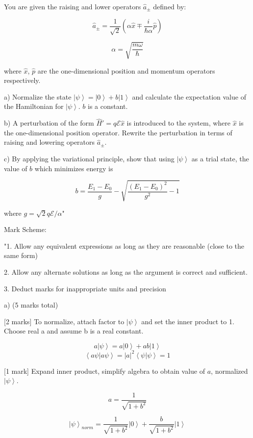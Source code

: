 You are given the raising and lower operators \( \hat{a}_{\pm} \) defined by:

\[ \hat{a}_{\pm} = \frac{1}{\sqrt{2}}(\alpha \hat{x} \mp \frac{i}{\hbar\alpha} \hat{p}) \]

\[ \alpha = \sqrt{\frac{m\omega}{\hbar}} \]

where \( \hat{x} \), \( \hat{p} \) are the one-dimensional position and momentum operators respectively.

a) Normalize the state \( \left| \psi \right> =  \left| 0 \right> + b \left| 1 \right> \) and calculate the expectation value of the Hamiltonian for \( \left| \psi \right> \). \( b \) is a constant.

b) A perturbation of the form \( \hat{H}' = q \mathcal{E} \hat{x} \) is introduced to the system, where \( \hat{x} \) is the one-dimensional position operator. Rewrite the perturbation in terms of raising and lowering operators \( \hat{a}_{\pm} \).

c) By applying the variational principle, show that using \( \left| \psi \right> \) as a trial state, the value of \( b \) which minimizes energy is 

\[ b = \frac{E_{1} - E_{0}}{g} - \sqrt{\frac{(E_{1} - E_{0})^{2}}{g^{2}} -1} \]

where \( g = \sqrt{2} q \mathcal{E} / {\alpha} \)"

Mark Scheme:

"1. Allow any equivalent expressions as long as they are reasonable (close to the same form)

2. Allow any alternate solutions as long as the argument is correct and sufficient. 

3. Deduct marks for inappropriate units and precision

a) (5 marks total)

[2 marks] To normalize, attach factor to \( \left| \psi \right> \) and set the inner product to 1. Choose real a and assume b is a real constant. 

\[ a \left| \psi \right> = a\left| 0 \right> + ab \left| 1 \right> \]
\[ \left< a\psi | a\psi \right> = |a|^2 \left< \psi | \psi \right> = 1 \]

[1 mark] Expand inner product, simplify algebra to obtain value of \( a \), normalized \( \left| \psi \right> \).

\[ a = \frac{1}{\sqrt{1+b^2}} \]

\[ \left| \psi \right>_{norm} = \frac{1}{\sqrt{1+b^2}} \left| 0 \right> + \frac{b}{\sqrt{1+b^2}} \left| 1 \right> \]

